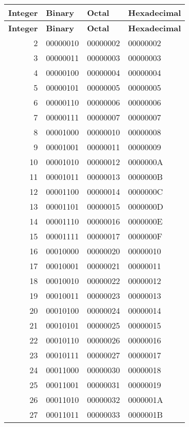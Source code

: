 \documentclass{article}
\begin{document}
\begin{longtable}{|r|l|l|l|}
\hline
\textbf{Integer} & \textbf{Binary} & \textbf{Octal} & \textbf{Hexadecimal} \\
\hline
\endfirsthead

\hline
\textbf{Integer} & \textbf{Binary} & \textbf{Octal} & \textbf{Hexadecimal} \\
\hline
\endhead

\hline
\endfoot

\hline
\endlastfoot

2 & 00000010 & 00000002 & 00000002 \\
3 & 00000011 & 00000003 & 00000003 \\
4 & 00000100 & 00000004 & 00000004 \\
5 & 00000101 & 00000005 & 00000005 \\
6 & 00000110 & 00000006 & 00000006 \\
7 & 00000111 & 00000007 & 00000007 \\
8 & 00001000 & 00000010 & 00000008 \\
9 & 00001001 & 00000011 & 00000009 \\
10 & 00001010 & 00000012 & 0000000A \\
11 & 00001011 & 00000013 & 0000000B \\
12 & 00001100 & 00000014 & 0000000C \\
13 & 00001101 & 00000015 & 0000000D \\
14 & 00001110 & 00000016 & 0000000E \\
15 & 00001111 & 00000017 & 0000000F \\
16 & 00010000 & 00000020 & 00000010 \\
17 & 00010001 & 00000021 & 00000011 \\
18 & 00010010 & 00000022 & 00000012 \\
19 & 00010011 & 00000023 & 00000013 \\
20 & 00010100 & 00000024 & 00000014 \\
21 & 00010101 & 00000025 & 00000015 \\
22 & 00010110 & 00000026 & 00000016 \\
23 & 00010111 & 00000027 & 00000017 \\
24 & 00011000 & 00000030 & 00000018 \\
25 & 00011001 & 00000031 & 00000019 \\
26 & 00011010 & 00000032 & 0000001A \\
27 & 00011011 & 00000033 & 0000001B \\

\end{longtable}
\end{document}
